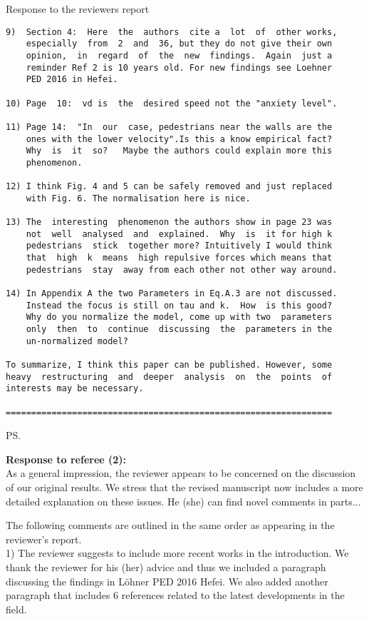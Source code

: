 \documentclass[a4paper,12pt]{letter}
\begin{document}
\begin{letter}{Response to the reviewers report}
\begin{verbatim}
9)  Section 4:  Here  the  authors  cite a  lot  of  other works,
    especially  from  2  and  36, but they do not give their own 
    opinion,  in  regard  of  the  new  findings.  Again  just a 
    reminder Ref 2 is 10 years old. For new findings see Loehner
    PED 2016 in Hefei.

10) Page  10:  vd is  the  desired speed not the "anxiety level".

11) Page 14:  "In  our  case, pedestrians near the walls are the
    ones with the lower velocity".Is this a know empirical fact?
    Why  is  it  so?   Maybe the authors could explain more this
    phenomenon. 

12) I think Fig. 4 and 5 can be safely removed and just replaced 
    with Fig. 6. The normalisation here is nice.

13) The  interesting  phenomenon the authors show in page 23 was
    not  well  analysed  and  explained.  Why  is  it for high k
    pedestrians  stick  together more? Intuitively I would think
    that  high  k  means  high repulsive forces which means that
    pedestrians  stay  away from each other not other way around.

14) In Appendix A the two Parameters in Eq.A.3 are not discussed. 
    Instead the focus is still on tau and k.  How  is this good? 
    Why do you normalize the model, come up with two  parameters
    only  then  to  continue  discussing  the  parameters in the 
    un-normalized model?

To summarize, I think this paper can be published. However, some
heavy  restructuring  and  deeper  analysis  on  the  points  of 
interests may be necessary. 

================================================================

\end{verbatim}


\ps{\textbf{Response to referee (2):} \\

As a general impression, the reviewer appears to be concerned on the discussion of our original results. 
We stress that the revised manuscript now includes a more detailed explanation on these issues. 
He (she) can find novel comments in parts...

The following comments are outlined in the same order as appearing in the
reviewer’s report. \\

1) The reviewer suggests to include more recent works in the introduction. We thank the reviewer for his (her) advice and thus we included a paragraph discussing the findings in L\"ohner PED 2016 Hefei.
We also added another paragraph that includes 6 references related to the latest developments in the field. \\

}
\end{letter}
\end{document}
